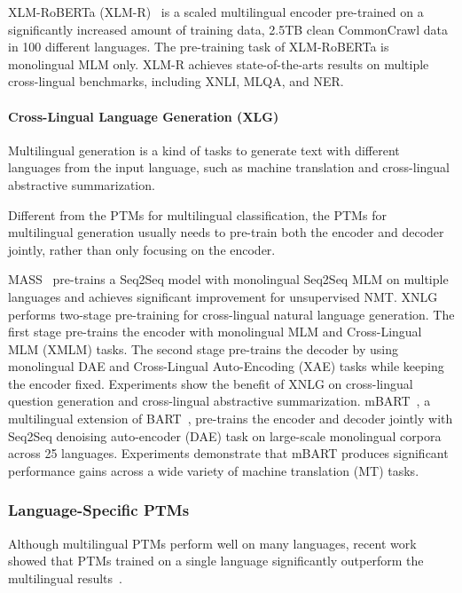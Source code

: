 \documentclass[fleqn]{SCYE-arxiv}
\begin{document}
\begin{multicols}{2}
XLM-RoBERTa (XLM-R)~\cite{conneau2019unsupervised} is a scaled multilingual encoder pre-trained on a significantly increased amount of training data, 2.5TB clean CommonCrawl data in 100 different languages. The pre-training task of XLM-RoBERTa is monolingual MLM only.
XLM-R achieves state-of-the-arts results on multiple cross-lingual benchmarks, including XNLI, MLQA, and NER.




\paragraph{Cross-Lingual Language Generation (XLG)}


Multilingual generation is a kind of tasks to generate text
with different languages from the input language, such as machine translation and
cross-lingual abstractive summarization.

Different from the PTMs for multilingual classification, the PTMs for multilingual generation usually needs to pre-train both the encoder and decoder jointly, rather than only focusing on the encoder.

MASS~\cite{DBLP:conf/icml/SongTQLL19} pre-trains a Seq2Seq model with monolingual Seq2Seq MLM on multiple languages and achieves
significant improvement for unsupervised NMT.
XNLG~\cite{chi2019cross} performs two-stage pre-training for cross-lingual natural language generation. The first stage pre-trains the encoder with monolingual MLM and Cross-Lingual MLM (XMLM) tasks. The second stage pre-trains the decoder by using monolingual DAE and Cross-Lingual Auto-Encoding (XAE) tasks while keeping the encoder fixed. Experiments show the benefit of XNLG on cross-lingual question generation and cross-lingual abstractive summarization.
mBART~\cite{liu2020multilingual}, a multilingual extension of BART~\cite{lewis2019bart}, pre-trains the encoder and decoder jointly with Seq2Seq denoising auto-encoder (DAE) task on large-scale monolingual corpora across 25 languages. Experiments demonstrate that mBART
produces significant performance gains across a wide variety of machine translation (MT) tasks.



\subsubsection{Language-Specific PTMs}
Although multilingual PTMs perform well on many languages, recent work showed that PTMs trained on a single language significantly outperform the multilingual results~\cite{martin2019camenbert,le2019flaubert,virtanen2019multilingual}.


\end{multicols}
\end{document}
